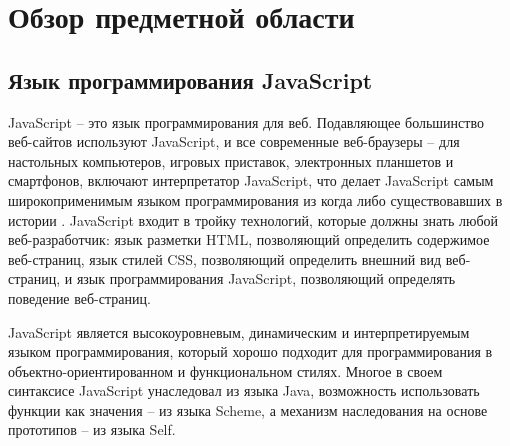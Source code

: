 \chapter{Обзор предметной области}

\section{Язык программирования JavaScript}

JavaScript -- это язык программирования для веб. Подавляющее большинство веб-сайтов используют JavaScript, и все современные веб-браузеры -- для настольных компьютеров, игровых приставок, электронных планшетов и смартфонов, включают интерпретатор JavaScript, что делает JavaScript самым широкоприменимым языком программирования из когда либо существовавших в истории \cite{JsDef6}. JavaScript входит в тройку технологий, которые должны знать  любой веб-разработчик: язык разметки HTML, позволяющий определить содержимое веб-страниц, язык стилей CSS, позволяющий определить внешний вид веб-страниц, и язык программирования JavaScript, позволяющий определять поведение веб-страниц.

JavaScript является высокоуровневым, динамическим и интерпретируемым языком программирования, который хорошо подходит для программирования в объектно-ориентированном и функциональном стилях. Многое в своем синтаксисе JavaScript унаследовал из языка Java, возможность использовать функции как значения -- из языка Scheme, а механизм наследования на основе прототипов -- из языка Self\cite{JsDef6}. 



